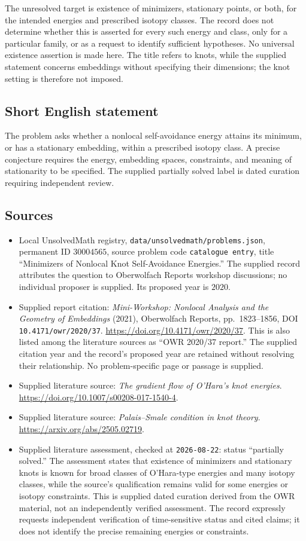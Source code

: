 \documentclass[11pt]{article}
\begin{document}
The unresolved target is existence of minimizers, stationary points, or both, for the intended energies and prescribed isotopy classes. The record does not determine whether this is asserted for every such energy and class, only for a particular family, or as a request to identify sufficient hypotheses. No universal existence assertion is made here. The title refers to knots, while the supplied statement concerns embeddings without specifying their dimensions; the knot setting is therefore not imposed.
\subsection{Short English statement}
The problem asks whether a nonlocal self-avoidance energy attains its minimum, or has a stationary embedding, within a prescribed isotopy class. A precise conjecture requires the energy, embedding spaces, constraints, and meaning of stationarity to be specified. The supplied partially solved label is dated curation requiring independent review.
\subsection{Sources}
\begin{itemize}
\item[\textnormal{[1]}] Local UnsolvedMath registry, \texttt{data/unsolvedmath/problems.json}, permanent ID \(30004565\), source problem code \texttt{catalogue entry}, title ``Minimizers of Nonlocal Knot Self-Avoidance Energies.'' The supplied record attributes the question to Oberwolfach Reports workshop discussions; no individual proposer is supplied. Its proposed year is \(2020\).
\item[\textnormal{[2]}] Supplied report citation: \emph{Mini-Workshop: Nonlocal Analysis and the Geometry of Embeddings} (2021), Oberwolfach Reports, pp.\ 1823--1856, DOI \texttt{10.4171/owr/2020/37}. \url{https://doi.org/10.4171/owr/2020/37}. This is also listed among the literature sources as ``OWR 2020/37 report.'' The supplied citation year and the record's proposed year are retained without resolving their relationship. No problem-specific page or passage is supplied.
\item[\textnormal{[3]}] Supplied literature source: \emph{The gradient flow of O'Hara's knot energies}. \url{https://doi.org/10.1007/s00208-017-1540-4}.
\item[\textnormal{[4]}] Supplied literature source: \emph{Palais--Smale condition in knot theory}. \url{https://arxiv.org/abs/2505.02719}.
\item[\textnormal{[5]}] Supplied literature assessment, checked at \texttt{2026-08-22}: status ``partially solved.'' The assessment states that existence of minimizers and stationary knots is known for broad classes of O'Hara-type energies and many isotopy classes, while the source's qualification remains valid for some energies or isotopy constraints. This is supplied dated curation derived from the OWR material, not an independently verified assessment. The record expressly requests independent verification of time-sensitive status and cited claims; it does not identify the precise remaining energies or constraints.
\end{itemize}
\end{document}
